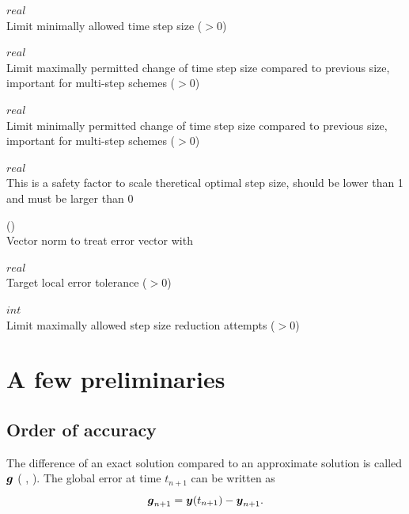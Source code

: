  $real$\\
Limit minimally allowed time step size ($>0$)

 $real$\\
Limit maximally permitted change of time step size compared to previous size, important for multi-step schemes ($>0$)

 $real$\\
Limit minimally permitted change of time step size compared to previous size, important for multi-step schemes ($>0$)

 $real$\\
This is a safety factor to scale theretical optimal step size, should be lower than 1 and must be larger than $0$

 (\kor{}\kor{}\kor{})\\
Vector norm to treat error vector with

 $real$\\
Target local error tolerance ($>0$)

 $int$\\
Limit maximally allowed step size reduction attempts ($>0$)

\section{A few preliminaries}

\subsection{Order of accuracy}\label{strdyn:sec:accuracy}
The difference of an exact solution compared to an approximate solution
is called  $\boldsymbol{g}$ ( \etal{}
\cite{strdyn:hairer87},  \etal{} \cite{strdyn:deuflhard94})\@. The global
error at time 
$t_{n+1}$ 
can be written as
\begin{equation}\label{strdyn:eq:global-error}
  \boldsymbol{g}_{n+1} = \boldsymbol{y}(t_{n+1}) - \boldsymbol{y}_{n+1}
  \text{.}
\end{equation}

